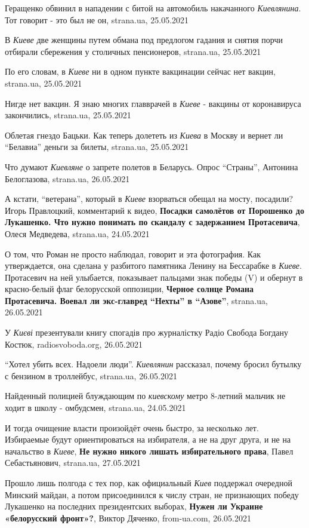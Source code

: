 Геращенко обвинил в нападении с битой на автомобиль накачанного
\emph{Киевлянина}. Тот говорит - это был не он, strana.ua, 25.05.2021

В \emph{Киеве} две женщины путем обмана под предлогом гадания и снятия порчи
отбирали сбережения у столичных пенсионеров, strana.ua, 25.05.2021

По его словам, в \emph{Киеве} ни в одном пункте вакцинации сейчас нет вакцин,
strana.ua, 25.05.2021

Нигде нет вакцин. Я знаю многих главврачей в \emph{Киеве} - вакцины от
коронавируса закончились, strana.ua, 25.05.2021

Облетая гнездо Бацьки. Как теперь долететь из \emph{Киева} в Москву и вернет ли
\enquote{Белавиа} деньги за билеты, strana.ua, 25.05.2021

Что думают \emph{Киевляне} о запрете полетов в Беларусь. Опрос
\enquote{Страны}, Антонина Белоглазова, strana.ua, 26.05.2021

А кстати, \enquote{ветерана}, который в \emph{Киеве} взорваться обещал на
мосту, посадили?  Игорь Правлоцкий, комментарий к видео, \textbf{Посадки
самолётов от Порошенко до Лукашенко. Что нужно понимать по скандалу с
задержанием Протасевича}, Олеся Медведева, strana.ua, 24.05.2021

О том, что Роман не просто наблюдал, говорит и эта фотография. Как
утверждается, она сделана у разбитого памятника Ленину на Бессарабке в
\emph{Киеве}.  Протасевич на ней улыбается, показывает пальцами знак победы (V)
и обернут в красно-белый флаг белорусской оппозиции, \textbf{Черное солнце
Романа Протасевича. Воевал ли экс-главред \enquote{Нехты} в \enquote{Азове}},
strana.ua, 26.05.2021

У \emph{Києві} презентували книгу спогадів про журналістку Радіо Свобода
Богдану Костюк, radiosvoboda.org, 26.05.2021

\enquote{Хотел убить всех. Надоели люди}. \emph{Киевлянин} рассказал, почему бросил бутылку с
бензином в троллейбус, strana.ua, 26.05.2021

Найденный полицией блуждающим по \emph{киевскому} метро 8-летний мальчик не
ходит в школу - омбудсмен, strana.ua, 24.05.2021

И тогда очищение власти произойдёт очень быстро, за несколько лет. Избираемые
будут ориентироваться на избирателя, а не на друг друга, и не на начальство в
\emph{Киеве}, \textbf{Не нужно никого лишать избирательного права}, Павел Себастьянович,
strana.ua, 27.05.2021

Прошло лишь полгода с тех пор, как официальный \emph{Киев} поддержал очередной Минский
майдан, а потом присоединился к числу стран, не признающих победу Лукашенко на
последних президентских выборах, \textbf{Нужен ли Украине «белорусский фронт»?}, Виктор
Дяченко, from-ua.com, 26.05.2021

